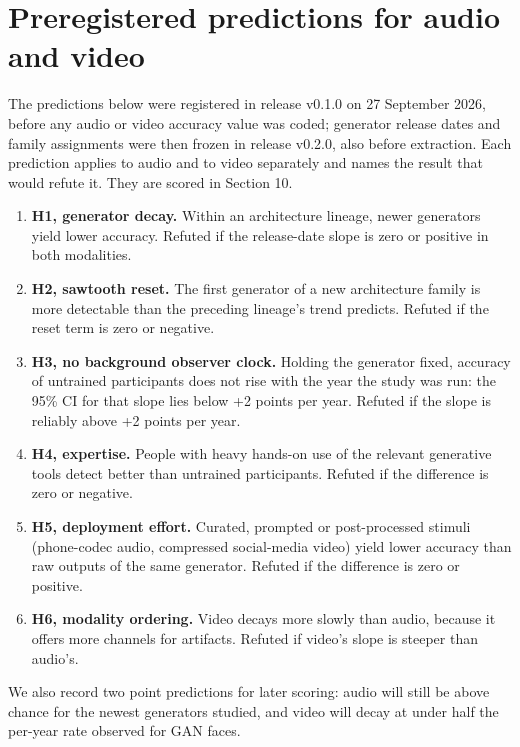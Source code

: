 \documentclass[11pt]{article}
\providecommand{\tightlist}{\setlength{\itemsep}{0pt}\setlength{\parskip}{0pt}}
\begin{document}
\hypertarget{preregistered-predictions-for-audio-and-video}{%
\section{Preregistered predictions for audio and
video}\label{preregistered-predictions-for-audio-and-video}}

The predictions below were registered in release v0.1.0 on 27 September
2026, before any audio or video accuracy value was coded; generator
release dates and family assignments were then frozen in release v0.2.0,
also before extraction. Each prediction applies to audio and to video
separately and names the result that would refute it. They are scored in
Section 10.

\begin{enumerate}
\def\labelenumi{\arabic{enumi}.}
\tightlist
\item
  \textbf{H1, generator decay.} Within an architecture lineage, newer
  generators yield lower accuracy. Refuted if the release-date slope is
  zero or positive in both modalities.
\item
  \textbf{H2, sawtooth reset.} The first generator of a new architecture
  family is more detectable than the preceding lineage's trend predicts.
  Refuted if the reset term is zero or negative.
\item
  \textbf{H3, no background observer clock.} Holding the generator
  fixed, accuracy of untrained participants does not rise with the year
  the study was run: the 95\% CI for that slope lies below +2 points per
  year. Refuted if the slope is reliably above +2 points per year.
\item
  \textbf{H4, expertise.} People with heavy hands-on use of the relevant
  generative tools detect better than untrained participants. Refuted if
  the difference is zero or negative.
\item
  \textbf{H5, deployment effort.} Curated, prompted or post-processed
  stimuli (phone-codec audio, compressed social-media video) yield lower
  accuracy than raw outputs of the same generator. Refuted if the
  difference is zero or positive.
\item
  \textbf{H6, modality ordering.} Video decays more slowly than audio,
  because it offers more channels for artifacts. Refuted if video's
  slope is steeper than audio's.
\end{enumerate}

We also record two point predictions for later scoring: audio will still
be above chance for the newest generators studied, and video will decay
at under half the per-year rate observed for GAN faces.
\end{document}
